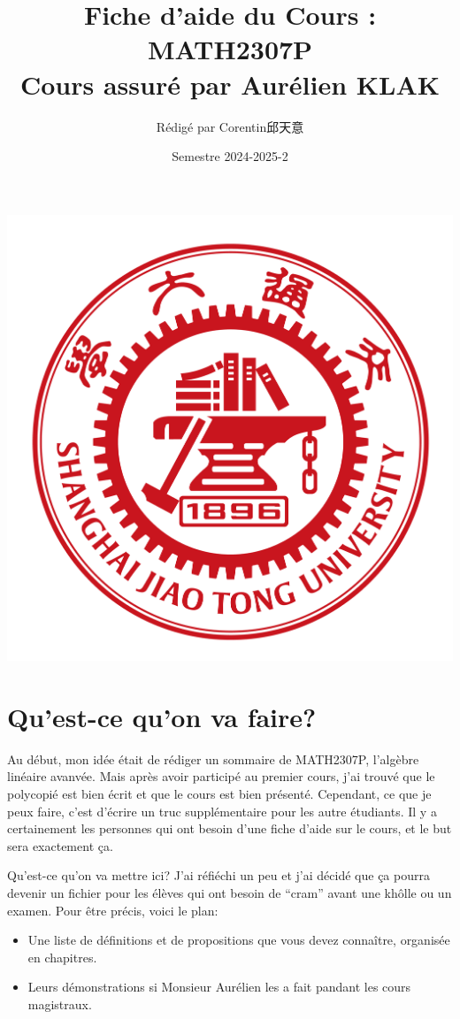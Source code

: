 \documentclass{article}
\title{\textbf{Fiche d'aide du Cours : MATH2307P} \\ Cours assuré par Aurélien KLAK}
\author{Rédigé par Corentin邱天意}
\date{Semestre 2024-2025-2}
\begin{document}
\maketitle

\centerline{\includegraphics[scale=0.4]{sjtu}}

\newpage


\newpage
\section*{Qu'est-ce qu'on va faire?}

Au début, mon idée était de rédiger un sommaire de MATH2307P, l'algèbre linéaire avanvée. Mais après avoir participé au premier cours, j'ai trouvé que le polycopié est bien écrit et que le cours est bien présenté. Cependant, ce que je peux faire, c'est d'écrire un truc supplémentaire pour les autre étudiants. Il y a certainement les personnes qui ont besoin d'une fiche d'aide sur le cours, et le but sera exactement ça.

Qu'est-ce qu'on va mettre ici? J'ai réfiéchi un peu et j'ai décidé que ça pourra devenir un fichier pour les élèves qui ont besoin de ``cram'' avant une khôlle ou un examen. Pour être précis, voici le plan:

\begin{itemize}
 \item Une liste de définitions et de propositions que vous devez connaître, organisée en chapitres.
 \item Leurs démonstrations si Monsieur Aurélien les a fait pandant les cours magistraux.
\end{itemize}
\end{document}
